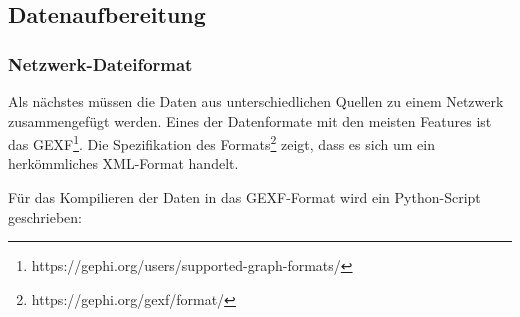 \subsection{Datenaufbereitung}
\label{sec:dataCleancing}

\subsubsection{Netzwerk-Dateiformat}
\label{subsec:networkFileformat}
Als nächstes müssen die Daten aus unterschiedlichen Quellen zu einem Netzwerk zusammengefügt werden.
Eines der Datenformate mit den meisten Features ist das GEXF\footnote{https://gephi.org/users/supported-graph-formats/}.
Die Spezifikation des Formats\footnote{https://gephi.org/gexf/format/} zeigt, dass es sich um ein herkömmliches XML-Format handelt.

Für das Kompilieren der Daten in das GEXF-Format wird ein Python-Script geschrieben:
